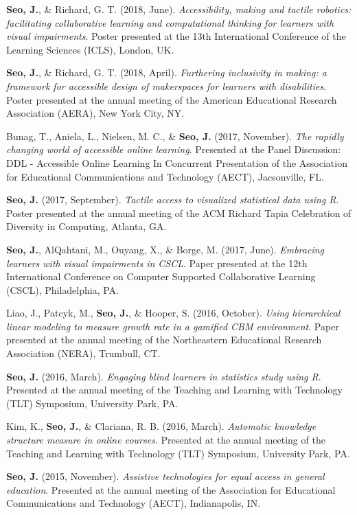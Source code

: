 \documentclass[11pt, a4paper]{awesome-cv}
\begin{document}
\textbf{Seo, J.}, \& Richard, G. T. (2018, June). \emph{Accessibility, making and tactile robotics: facilitating collaborative learning and computational thinking for learners with visual impairments}. Poster presented at the 13th International Conference of the Learning Sciences (ICLS), London, UK.

\textbf{Seo, J.}, \& Richard, G. T. (2018, April). \emph{Furthering inclusivity in making: a framework for accessible design of makerspaces for learners with disabilities}. Poster presented at the annual meeting of the American Educational Research Association (AERA), New York City, NY.

Bunag, T., Aniela, L., Nielsen, M. C., \& \textbf{Seo, J.} (2017, November). \emph{The rapidly changing world of accessible online learning}. Presented at the Panel Discussion: DDL - Accessible Online Learning In Concurrent Presentation of the Association for Educational Communications and Technology (AECT), Jacsonville, FL.

\textbf{Seo, J.} (2017, September). \emph{Tactile access to visualized statistical data using R}. Poster presented at the annual meeting of the ACM Richard Tapia Celebration of Diversity in Computing, Atlanta, GA.

\textbf{Seo, J.}, AlQahtani, M., Ouyang, X., \& Borge, M. (2017, June). \emph{Embracing learners with visual impairments in CSCL}. Paper presented at the 12th International Conference on Computer Supported Collaborative Learning (CSCL), Philadelphia, PA.

Liao, J., Patcyk, M., \textbf{Seo, J.}, \& Hooper, S. (2016, October). \emph{Using hierarchical linear modeling to measure growth rate in a gamified CBM environment}. Paper presented at the annual meeting of the Northeastern Educational Research Association (NERA), Trumbull, CT.

\textbf{Seo, J.} (2016, March). \emph{Engaging blind learners in statistics study using R}. Presented at the annual meeting of the Teaching and Learning with Technology (TLT) Symposium, University Park, PA.

Kim, K., \textbf{Seo, J.}, \& Clariana, R. B. (2016, March). \emph{Automatic knowledge structure measure in online courses}. Presented at the annual meeting of the Teaching and Learning with Technology (TLT) Symposium, University Park, PA.

\textbf{Seo, J.} (2015, November). \emph{Assistive technologies for equal access in general education}. Presented at the annual meeting of the Association for Educational Communications and Technology (AECT), Indianapolis, IN.
\end{document}
